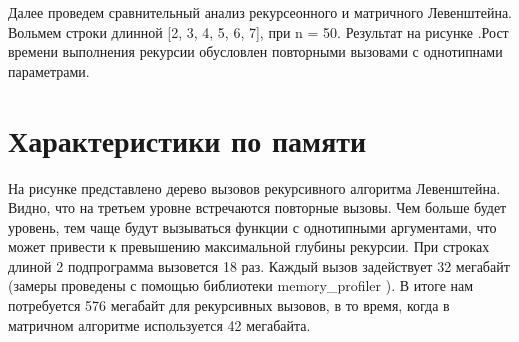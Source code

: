 \documentclass[12pt,a4paper]{report}
\begin{document}
\begin{figure}[ht!]
\end{figure}

Далее проведем сравнительный анализ рекурсеонного и матричного Левенштейна. Вольмем строки длинной [2, 3, 4, 5, 6, 7], при n = 50. Результат на рисунке  .Рост времени выполнения рекурсии обусловлен повторными вызовами с однотипнами параметрами. 

\begin{figure}[ht!]
\end{figure}

\section{Характеристики по памяти}

На рисунке  представлено дерево вызовов рекурсивного алгоритма Левенштейна.
Видно, что на третьем уровне встречаются повторные вызовы. 
Чем больше будет уровень, тем чаще будут вызываться функции с однотипными аргументами, что может привести к превышению максимальной глубины рекурсии. 
При строках длиной 2 подпрограмма вызовется 18 раз. 
Каждый вызов задействует 32 мегабайт (замеры проведены с помощью  библиотеки memory\_profiler ).
В итоге нам потребуется 576 мегабайт для рекурсивных вызовов, в то время, когда в матричном алгоритме используется 42 мегабайта. 
\end{document}
